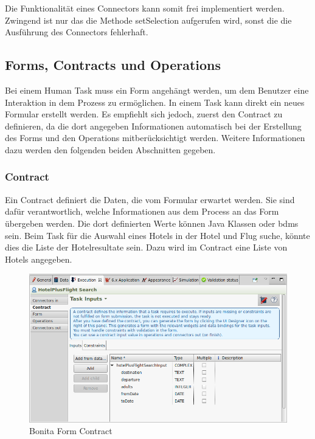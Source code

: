 Die Funktionalität eines Connectors kann somit frei implementiert werden. Zwingend ist nur das die Methode setSelection aufgerufen wird, sonst die die Ausführung des Connectors fehlerhaft.

\subsection{Forms, Contracts und Operations}
\label{sec:analyse:bonita:forms}
Bei einem Human Task muss ein Form angehängt werden, um dem Benutzer eine Interaktion in dem Prozess zu ermöglichen.
In einem Task kann direkt ein neues Formular erstellt werden. Es empfiehlt sich jedoch, zuerst den Contract zu definieren, da die dort angegeben Informationen automatisch bei der Erstellung des Forms und den Operations mitberücksichtigt werden. Weitere Informationen dazu werden den folgenden beiden Abschnitten gegeben.

\subsubsection{Contract}
\label{sec:analyse:bonita:forms:contract}
Ein Contract definiert die Daten, die vom Formular erwartet werden. Sie sind dafür verantwortlich, welche Informationen aus dem Process an das Form übergeben werden. Die dort definierten Werte können Java Klassen oder \glspl{bdm} sein. Beim Task für die Auswahl eines Hotels in der Hotel und Flug suche, könnte dies die Liste der Hotelresultate sein. Dazu wird im Contract eine Liste von Hotels angegeben.
\begin{figure}[H]
	\centering
	\includegraphics[width=1\textwidth]{images/bonita-contract.png}
	\caption{Bonita Form Contract}
	\label{fig:analyse:bonita:forms:contract}
\end{figure}

